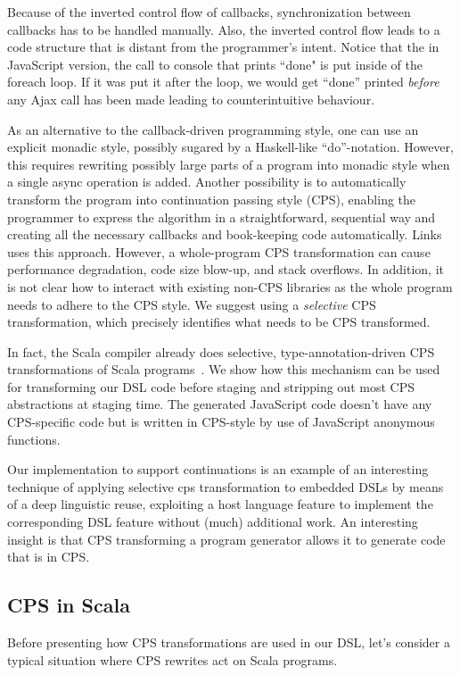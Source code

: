 \documentclass[runningheads,a4paper]{llncs}
\begin{document}
\lstset{basicstyle=\ttfamily}

Because of the inverted control flow of callbacks, synchronization between callbacks has to be handled manually. Also, the inverted control flow leads to a code structure that is distant from the programmer's intent. Notice that the in JavaScript version, the call to console that prints ``done" is put inside of the foreach loop. If it was put it after the loop, we would get ``done'' printed \emph{before} any Ajax call has been made leading to counterintuitive behaviour.

As an alternative to the callback-driven programming style, one can use an explicit monadic style, possibly sugared by a Haskell-like ``do''-notation. However, this requires rewriting possibly large parts of a program into monadic style when a single async operation is added. Another possibility is to automatically transform the program into continuation passing style (CPS), enabling the programmer to express the algorithm in a straightforward, sequential way and creating all the necessary callbacks and book-keeping code automatically. Links~\cite{links} uses this approach. However, a whole-program CPS transformation can cause performance degradation, code size blow-up, and stack overflows. In addition, it is not clear how to interact with existing non-CPS libraries as the whole program needs to adhere to the CPS style. We suggest using a {\it selective} CPS transformation, which precisely identifies what needs to be CPS transformed.

In fact, the Scala compiler already does selective,  type-annotation-driven CPS transformations of Scala programs~\cite{cps-scala,danvy90,danvy92}. We show how this mechanism can be used for transforming our DSL code before staging and stripping out most CPS abstractions at staging time. The generated JavaScript code doesn't have any CPS-specific code but is written in CPS-style by use of JavaScript anonymous functions.

Our implementation to support continuations is an example of an interesting technique of applying selective cps
transformation to embedded DSLs by means of a deep linguistic reuse, exploiting a host language feature to
implement the corresponding DSL feature without (much) additional work. An interesting insight is that CPS
transforming a program generator allows it to generate code that is in CPS.

\subsection{CPS in Scala}
Before presenting how CPS transformations are used in our DSL, let's consider a typical situation where CPS rewrites act on Scala programs.
\end{document}
